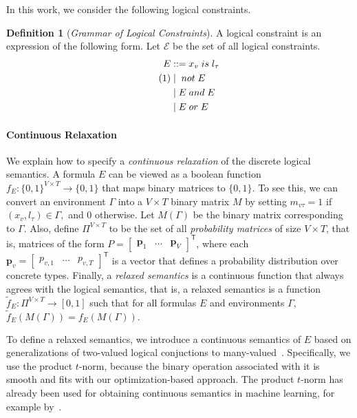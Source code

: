 \documentclass[sigplan,10pt,review,anonymous]{acmart} %
\newcommand\numberthis{\addtocounter{equation}{1}\tag{\theequation}}
\theoremstyle{plain}
\theoremstyle{remark}
\theoremstyle{definition}
\newtheorem{defn}{Definition}[section]
\begin{document}
In this work, we consider the following logical constraints.
\begin{defn}[\emph{Grammar of Logical Constraints}]\label{def:log-gram}
  A logical constraint is an expression of the following form.
  Let $\mathcal{E}$ be the set of all logical constraints.
  \begin{align*}
    E & ::= x_v \mathrel{is} l_\tau \\ \numberthis\label{eq:gram}
      & \mid{} \mathrel{not} E      \\
      & \mid E \mathrel{and} E      \\
      & \mid E \mathrel{or} E
  \end{align*}
\end{defn}
\paragraph{Continuous Relaxation}
We explain how to specify a \emph{continuous relaxation} of the discrete logical semantics.
A formula $E$ can be viewed as a boolean function $f_E: \{0, 1\}^{V \times T} \rightarrow \{0, 1\}$
that maps binary matrices to $\{0, 1\}$.
To see this, we can convert an environment
$\Gamma$ into a $V \times T$ binary matrix $M$ by setting $m_{v\tau} = 1$ if
$(x_v, l_\tau) \in \Gamma,$ and 0 otherwise.
Let $M(\Gamma)$ be the binary
matrix corresponding to $\Gamma$.
Also, define $\Pi^{V \times T}$ to be the set
of all \emph{probability matrices} of size $V \times T$,
that is, matrices of the form $P = \begin{bmatrix} \bm{p}_1 & \ldots & \bm{p}_{V} \end{bmatrix}^\mathsf{T}$,
where each $\bm{p}_v = \begin{bmatrix} p_{v,1} & \ldots & p_{v,{T}} \end{bmatrix}^\mathsf{T}$
is a vector that defines a probability distribution over concrete types.
Finally, a \emph{relaxed semantics} is a continuous function
that always agrees with the logical semantics, that is,
a relaxed semantics is a function
$\tilde{f}_{E} : \Pi^{V \times T}  \rightarrow [0, 1]$
such that for all formulas $E$ and environments $\Gamma$,
$\tilde{f}_{E}(M(\Gamma)) = f_E(M(\Gamma)).$

To define a relaxed semantics, we introduce a continuous semantics of $E$ based on generalizations of two-valued logical conjuctions
to many-valued~\cite{hajek1998}.
Specifically, we use the product $t$-norm, because the binary operation associated with it is smooth and fits with our optimization-based approach.
The product $t$-norm has already been used for obtaining continuous semantics in machine learning, for example by~\citet{rocktaschel15}.
\end{document}
